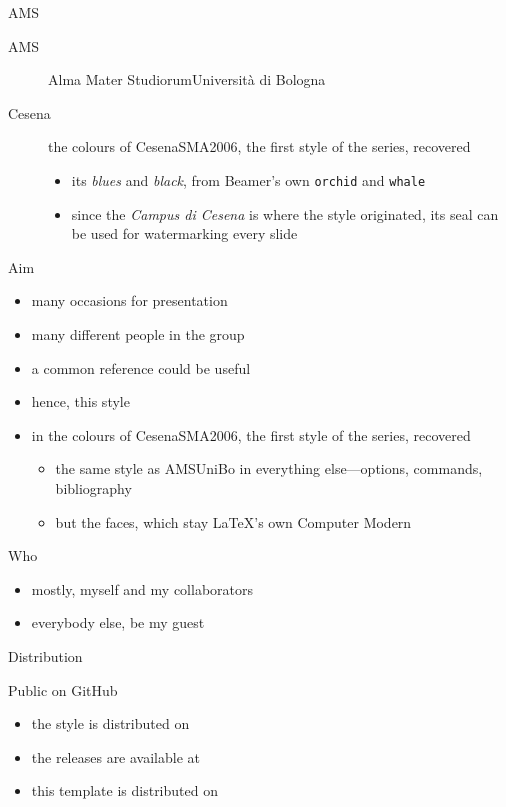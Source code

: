 \documentclass[presentation,cesena,apice]{beamer}\mode<presentation>{\usetheme{AMSCesena}}
\begin{document}
\begin{frame}[c]{AMS}
%
\begin{description}
	\item[AMS] Alma Mater Studiorum\textendash{}Università di Bologna
	\item[Cesena] the colours of \alert{CesenaSMA2006}, the first style of the series, recovered
	\begin{itemize}
		\item its \textcolor{owblue}{\textit{blues}} and \textcolor{owblack}{\textit{black}}, from Beamer's own \texttt{orchid} and \texttt{whale}
		\item since the \emph{Campus di Cesena} is where the style originated, its seal can be used for watermarking every slide
	\end{itemize}
\end{description}
%
\end{frame}

\begin{frame}[c]{Aim}
%
\begin{itemize}
	\item many occasions for presentation
	\item many different people in the group
	\item a common reference could be useful
	\item hence, this style
	\item in the colours of \alert{CesenaSMA2006}, the first style of the series, recovered
	\begin{itemize}
		\item the same style as \alert{AMSUniBo} in everything else---options, commands, bibliography
		\item but the faces, which stay \LaTeX{}'s own Computer Modern
	\end{itemize}
\end{itemize}
%
\end{frame}

\begin{frame}[c]{Who}
%
\begin{itemize}
	\item mostly, myself and my collaborators
	\item everybody else, be my guest
\end{itemize}
%
\end{frame}

\begin{frame}[c]{Distribution}
%
\begin{block}{Public on GitHub}
	\begin{itemize}
		\item the style is distributed on 
		\item the releases are available at 
		\item this template is distributed on 
	\end{itemize}
\end{block}
%
\end{frame}
\end{document}
